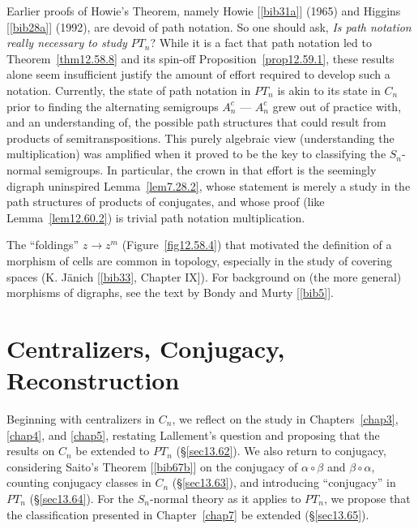 \documentclass{surv-l}
\numberwithin{equation}{section}
\numberwithin{table}{section}
\numberwithin{figure}{section}
\theoremstyle{plain}
\theoremstyle{definition}
\begin{document}
Earlier proofs of Howie's Theorem, namely
Howie [\ref{bib31a}] (1965) and
Higgins [\ref{bib28a}]
(1992), are devoid of path notation. So one should ask, \emph{Is
path notation really necessary to study} $PT_{n}$? While it is a
fact that path notation led to Theorem~\ref{thm12.58.8} and its
spin-off Proposition~\ref{prop12.59.1}, these results alone seem
insufficient justify the amount of effort required to develop such
a notation. Currently, the state of path notation in $PT_{n}$ is
akin to its state in $C_{n}$ prior to finding the alternating
semigroups $A_{n}^{c}$ --- $A_{n}^{c}$ grew out of practice with, and an
understanding of, the possible path structures that could result
from products of semitranspositions. This purely algebraic view
(understanding the multiplication) was amplified when it proved to
be the key to classifying the $S_{n}$-normal semigroups. In
particular, the crown in that effort is the seemingly digraph
uninspired Lemma~\ref{lem7.28.2}, whose statement is merely a
study in the path structures of products of conjugates, and whose
proof (like Lemma~\ref{lem12.60.2}) is trivial path notation
multiplication.

The ``foldings'' $z\rightarrow z^{m}$ (Figure~\ref{fig12.58.4})
that motivated the definition of a morphism of cells are common in
topology, especially in the study of covering spaces (K.
J\"{a}nich [\ref{bib33},
Chapter IX]). For background on (the more general) morphisms of
digraphs, see the text by Bondy and Murty
[\ref{bib5}].

\chapter{Centralizers, Conjugacy, Reconstruction}\label{chap13}

Beginning with centralizers in $C_{n}$, we reflect on the study in
Chapters~\ref{chap3}, \ref{chap4}, and \ref{chap5}, restating
Lallement's question and proposing that the results on $C_{n}$ be
extended to $PT_{n}$ (\S\ref{sec13.62}). We also return to
conjugacy, considering Saito's Theorem
[\ref{bib67b}] on the conjugacy of $\alpha
\circ\beta$ and $\beta \circ\alpha$, counting conjugacy classes in
$C_{n}$ (\S\ref{sec13.63}), and introducing ``conjugacy'' in
$PT_{n}$ (\S\ref{sec13.64}). For the $S_{n}$-normal theory as it
applies to $PT_{n}$, we propose that the classification presented
in Chapter~\ref{chap7} be extended (\S\ref{sec13.65}).
\end{document}
